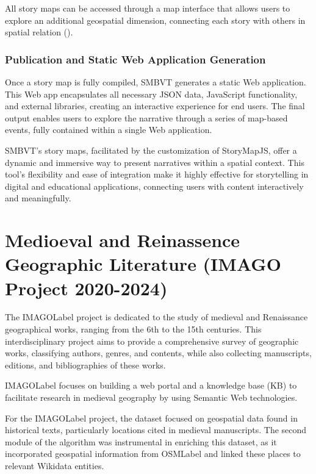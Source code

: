 All story maps can be accessed through a map interface that allows users to explore an additional geospatial dimension, connecting each story with others in spatial relation ().

\subsubsection{Publication and Static Web Application Generation}
Once a story map is fully compiled, SMBVT generates a static Web application. This Web app encapsulates all necessary JSON data, JavaScript functionality, and external libraries, creating an interactive experience for end users. The final output enables users to explore the narrative through a series of map-based events, fully contained within a single Web application.

SMBVT’s story maps, facilitated by the customization of StoryMapJS, offer a dynamic and immersive way to present narratives within a spatial context. This tool’s flexibility and ease of integration make it highly effective for storytelling in digital and educational applications, connecting users with content interactively and meaningfully.


\section{Medioeval and Reinassence Geographic Literature (IMAGO Project 2020-2024)}\label{VII-sec:imago}

The \acrfull{IMAGOLabel} project \cite{IMAGOProject} is dedicated to the study of medieval and Renaissance geographical works, ranging from the 6th to the 15th centuries. This interdisciplinary project aims to provide a comprehensive survey of geographic works, classifying authors, genres, and contents, while also collecting manuscripts, editions, and bibliographies of these works. 

\acrshort{IMAGOLabel} focuses on building a web portal and a knowledge base (KB) to facilitate research in medieval geography by using Semantic Web technologies. 

For the \acrshort{IMAGOLabel} project, the dataset focused on geospatial data found in historical texts, particularly locations cited in medieval manuscripts. The second module of the algorithm was instrumental in enriching this dataset, as it incorporated geospatial information from \acrshort{OSMLabel} and linked these places to relevant Wikidata entities.

